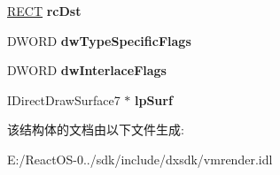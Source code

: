 \begin{DoxyCompactItemize}
\hyperlink{structtag_r_e_c_t}{R\+E\+CT} {\bfseries rc\+Dst}
\item 
\mbox{\label{structtag_v_m_r_p_r_e_s_e_n_t_a_t_i_o_n_i_n_f_o_a9ea561cdcf16a848c10c74318084442c}} 
D\+W\+O\+RD {\bfseries dw\+Type\+Specific\+Flags}
\item 
\mbox{\label{structtag_v_m_r_p_r_e_s_e_n_t_a_t_i_o_n_i_n_f_o_afd587021382afdbaecfd7f0fa7287f1c}} 
D\+W\+O\+RD {\bfseries dw\+Interlace\+Flags}
\item 
\mbox{\label{structtag_v_m_r_p_r_e_s_e_n_t_a_t_i_o_n_i_n_f_o_adbc856525b4d4f1bb576f913f6b1ddbb}} 
I\+Direct\+Draw\+Surface7 $\ast$ {\bfseries lp\+Surf}
\end{DoxyCompactItemize}


该结构体的文档由以下文件生成\+:\begin{DoxyCompactItemize}
\item 
E\+:/\+React\+O\+S-\/0../sdk/include/dxsdk/vmrender.\+idl\end{DoxyCompactItemize}

